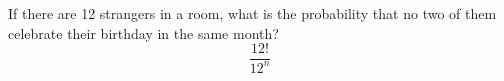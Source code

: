 \item If there are 12 strangers in a room, what is the probability that no two of them celebrate their birthday in the same month?
\[ 
\frac{12!}{12^n}
\]